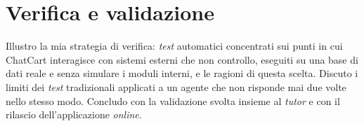 
\section{Verifica e validazione}
\label{sec:verifica}

Illustro la mia strategia di verifica: \emph{test} automatici concentrati sui punti in cui ChatCart
interagisce con sistemi esterni che non controllo, eseguiti su una base di dati reale e senza
simulare i moduli interni, e le ragioni di questa scelta. Discuto i limiti dei \emph{test}
tradizionali applicati a un agente che non risponde mai due volte nello stesso modo. Concludo con la
validazione svolta insieme al \emph{tutor} e con il rilascio dell’applicazione \emph{online}.
